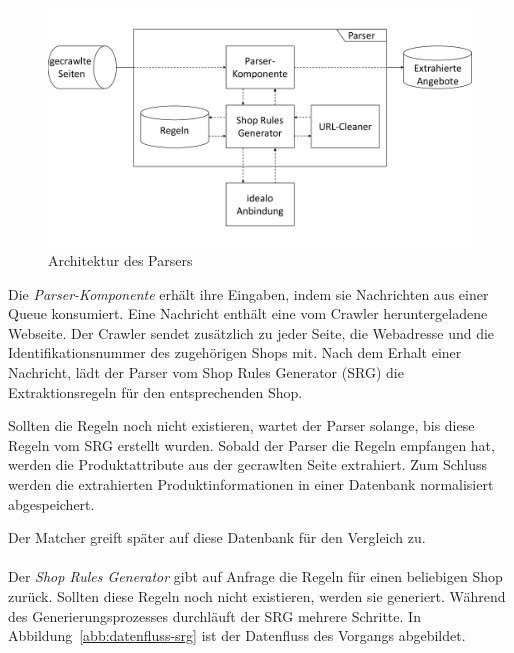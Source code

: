 \begin{figure}[H]
    \centering
    \includegraphics[width=13cm, trim=0 1.7cm 0 1.7cm, clip]{resources/Architektur-Parser.pdf}
    \caption{Architektur des Parsers}
    \label{abb:architektur-parser}
\end{figure}

Die \textit{Parser-Komponente} erhält ihre Eingaben, indem sie Nachrichten aus einer Queue konsumiert.
Eine Nachricht enthält eine vom Crawler heruntergeladene Webseite.
Der Crawler sendet zusätzlich zu jeder Seite, die Webadresse und die Identifikationsnummer des zugehörigen Shops mit.
Nach dem Erhalt einer Nachricht, lädt der Parser vom Shop Rules Generator (SRG) die Extraktionsregeln für den
entsprechenden Shop.

Sollten die Regeln noch nicht existieren, wartet der Parser solange, bis diese Regeln vom SRG erstellt wurden.
Sobald der Parser die Regeln empfangen hat, werden die Produktattribute aus der gecrawlten Seite extrahiert.
Zum Schluss werden die extrahierten Produktinformationen in einer Datenbank normalisiert abgespeichert.

Der Matcher greift später auf diese Datenbank für den Vergleich zu.
\\
~\\
Der \textit{Shop Rules Generator} gibt auf Anfrage die Regeln für einen beliebigen Shop zurück.
Sollten diese Regeln noch nicht existieren, werden sie generiert.
Während des Generierungsprozesses durchläuft der SRG mehrere Schritte.
In Abbildung~\ref{abb:datenfluss-srg} ist der Datenfluss des Vorgangs abgebildet.

